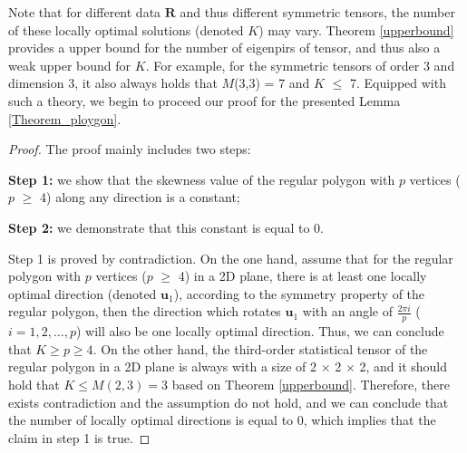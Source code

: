 Note  that   for  different  data $ \mathbf R$ and  thus  different   symmetric  tensors, 
the number of  these   locally  optimal  solutions (denoted $K$)   may    vary.  Theorem  \ref{upperbound}  provides  a  upper  bound   for  the  number  of  eigenpirs of  tensor, 
and thus also  a  weak   upper  bound  for  $K$.
 For  example,   for  the   symmetric tensors  of order 3 and dimension 3, it  also  always  holds   that 
$M$(3,3) = 7 and $ K$ $\le$ 7.
Equipped  with  such  a  theory, we  begin to proceed  our  proof for  the presented   Lemma \ref{Theorem_ploygon}.
\begin{proof}
	The proof   mainly   includes   two  steps: 
	
	\textbf{Step 1:}  	we    show  that  the skewness value of the   regular  polygon  with  $p$  vertices 
	($p$ $\ge$ 4)  along  any  direction  is  a  constant;
	
	\textbf{Step 2:}   we   demonstrate that  this  constant  is  equal to 0. 
	
	Step  1  is  proved  by contradiction.   
	On  the  one  hand, assume  that   for  the   regular  polygon  with  $p$  vertices 
	($p$ $\ge$ 4)  in  a  2D  plane,  there  is  at  least  one  locally  optimal   direction (denoted $\mathbf u_{1}$),  
	according  to  the  symmetry  property  of  the  regular  polygon, 
	then  the  direction  which    rotates   $\mathbf u_{1}$  with  an  angle  of  $ \frac  {2\pi i} {p}$  ($i=1, 2 , \dots, p$)     will  also be  one locally  optimal   direction.
	Thus,   we  can  conclude  that  $ K \ge p \ge  4$. 
	On the other  hand,  the  third-order  statistical  tensor  of  the   regular  polygon   in  a  2D  plane
	is  always with   a   size  of   2  $\times$ 2  $\times$ 2,  and it  should  hold  that  $ K \le  M(2,3) = 3$    based  on  Theorem  \ref{upperbound}. 
	Therefore,  there  exists  contradiction  and the  assumption do  not  hold,  and  we  can conclude that  the  number of  locally  optimal   directions  is  equal to  0,  which  implies  that  the claim  in  step  1  is  true.  
	

\end{proof}
